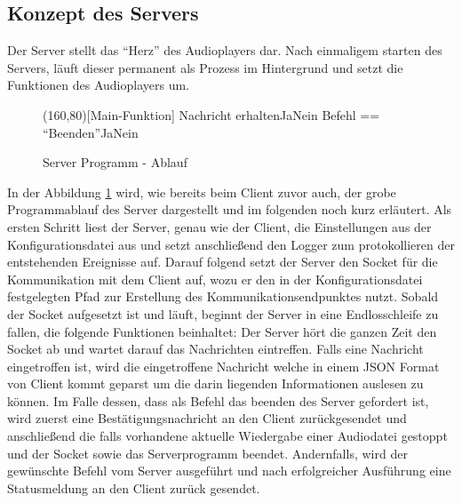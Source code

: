 \subsection{Konzept des Servers}

Der Server stellt das \enquote{Herz} des Audioplayers dar. Nach einmaligem starten des Servers, läuft dieser permanent als Prozess im Hintergrund und setzt die Funktionen des Audioplayers um.

\begin{figure}[H]
    \begin{struktogramm}(160,80)[Main-Funktion] 
        	 {Nachricht erhalten}{Ja}{Nein}
        	     {Befehl == \enquote{Beenden}}{Ja}{Nein}
        	    	\change
        	    \ifend
        		\change
        	\ifend
        \whileend
    \end{struktogramm} 
\caption{Server Programm - Ablauf} 
\label{lst:server_ablauf} 
\end{figure}

In der Abbildung \ref{lst:server_ablauf} wird, wie bereits beim Client zuvor auch, der grobe Programmablauf des Server dargestellt und im folgenden noch kurz erläutert. Als ersten Schritt liest der Server, genau wie der Client, die Einstellungen aus der Konfigurationsdatei aus und setzt anschließend den Logger zum protokollieren der entstehenden Ereignisse auf. Darauf folgend setzt der Server den Socket für die Kommunikation mit dem Client auf, wozu er den in der Konfigurationsdatei festgelegten Pfad zur Erstellung des Kommunikationsendpunktes nutzt. Sobald der Socket aufgesetzt ist und läuft, beginnt der Server in eine Endlosschleife zu fallen, die folgende Funktionen beinhaltet:
Der Server hört die ganzen Zeit den Socket ab und wartet darauf das Nachrichten eintreffen. Falls eine Nachricht eingetroffen ist, wird die eingetroffene Nachricht welche in einem \ac{JSON} Format von Client kommt geparst um die darin liegenden Informationen auslesen zu können. Im Falle dessen, dass als Befehl das beenden des Server gefordert ist, wird zuerst eine Bestätigungsnachricht an den Client zurückgesendet und anschließend die falls vorhandene aktuelle Wiedergabe einer Audiodatei gestoppt und der Socket sowie das Serverprogramm beendet. Andernfalls, wird der gewünschte Befehl vom Server ausgeführt und nach erfolgreicher Ausführung eine Statusmeldung an den Client zurück gesendet.
	

